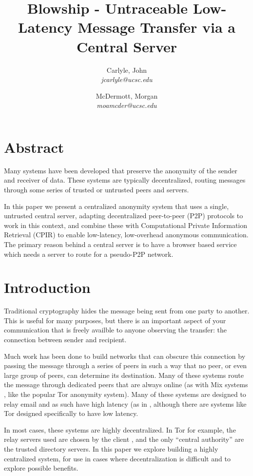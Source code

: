 \documentclass[twocolumn,11pt,english]{article}
\title{Blowship - Untraceable Low-Latency Message Transfer via a Central Server}
\date{}
\author{
  Carlyle, John\\
  \textit{jcarlyle@ucsc.edu}
  \and
  McDermott, Morgan\\
  \textit{moamcder@ucsc.edu}
}
\begin{document}
\maketitle

\section*{Abstract} 
Many systems have been developed that preserve the anonymity of the sender and receiver of data. These systems are typically decentralized, routing messages through some series of trusted or untrusted peers and servers. 

In this paper we present a centralized anonymity system that uses a single, untrusted central server, adapting decentralized peer-to-peer (P2P) protocols to work in this context, and combine these with Computational Private Information Retrieval (CPIR) to enable low-latency, low-overhead anonymous communication. The primary reason behind a central server is to have a browser based service which needs a server to route for a pseudo-P2P network.

\section{Introduction}

Traditional cryptography hides the message being sent from one party to another. This is useful for many purposes, but there is an important aspect of your communication that is freely availble to anyone observing the transfer: the connection between sender and recipient. 

Much work has been done to build networks that can obscure this connection by passing the message through a series of peers in such a way that no peer, or even large group of peers, can determine its destination. Many of these systems route the message through dedicated peers that are always online (as with Mix systems \cite{chaum-mix}, like the popular Tor\cite{tor-design} anonymity system). Many of these systems are designed to relay email and as such have high latency (as in \cite{minion-design}, although there are systems like Tor designed specifically to have low latency. 

In most cases, these systems are highly decentralized. In Tor for example, the relay servers used are chosen by the client \cite{tor-design}, and the only ``central authority'' are the trusted directory servers. In this paper we explore building a highly centralized system, for use in cases where decentralization is difficult and to explore possible benefits. 
\end{document}

